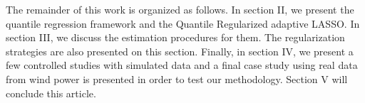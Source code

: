 
The remainder of this work is organized as follows. In section II, we present the quantile regression framework and the Quantile Regularized adaptive LASSO. In section III, we discuss the estimation procedures for them. The regularization strategies are also presented on this section. Finally, in section IV, we present a few controlled studies with simulated data and a final case study using real data from wind power is presented in order to test our methodology. Section V will conclude this article.
